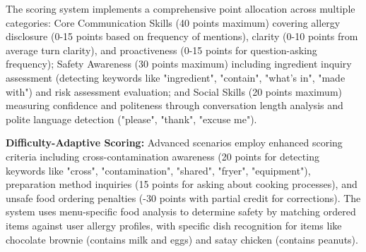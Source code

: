\documentclass[MScCS]{uccthesis}
\begin{document}
The scoring system implements a comprehensive point allocation across multiple categories: Core Communication Skills (40 points maximum) covering allergy disclosure (0-15 points based on frequency of mentions), clarity (0-10 points from average turn clarity), and proactiveness (0-15 points for question-asking frequency); Safety Awareness (30 points maximum) including ingredient inquiry assessment (detecting keywords like "ingredient", "contain", "what's in", "made with") and risk assessment evaluation; and Social Skills (20 points maximum) measuring confidence and politeness through conversation length analysis and polite language detection ("please", "thank", "excuse me").

\textbf{Difficulty-Adaptive Scoring:} Advanced scenarios employ enhanced scoring criteria including cross-contamination awareness (20 points for detecting keywords like "cross", "contamination", "shared", "fryer", "equipment"), preparation method inquiries (15 points for asking about cooking processes), and unsafe food ordering penalties (-30 points with partial credit for corrections). The system uses menu-specific food analysis to determine safety by matching ordered items against user allergy profiles, with specific dish recognition for items like chocolate brownie (contains milk and eggs) and satay chicken (contains peanuts).
\end{document}
